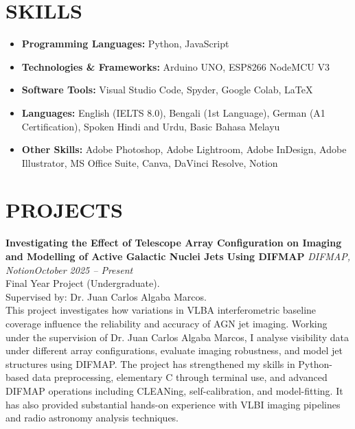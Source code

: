 \documentclass[10pt,a4paper]{article}
\begin{document}
\vspace{0.7mm}
\section*{SKILLS}
\begin{itemize}
    \item \textbf{Programming Languages:} Python, JavaScript
    \item \textbf{Technologies \& Frameworks:} Arduino UNO, ESP8266 NodeMCU V3
    \item \textbf{Software Tools:} Visual Studio Code, Spyder, Google Colab, LaTeX
    \item \textbf{Languages:} English (IELTS 8.0), Bengali (1st Language), German (A1 Certification), Spoken Hindi and Urdu, Basic Bahasa Melayu
    \item \textbf{Other Skills:} Adobe Photoshop, Adobe Lightroom, Adobe InDesign, Adobe Illustrator, MS Office Suite, Canva, DaVinci Resolve, Notion
\end{itemize}
\vspace{2mm}


\vspace{0.7mm}
\section*{PROJECTS}
\vspace{1mm}
\textbf{Investigating the Effect of Telescope Array Configuration on Imaging and Modelling of Active Galactic Nuclei Jets Using DIFMAP} \textbar{} \textit{DIFMAP, Notion}\hfill\textit{October 2025 -- Present}\\[1mm]
Final Year Project (Undergraduate).\\ 
Supervised by: Dr. Juan Carlos Algaba Marcos.\\[1mm]
This project investigates how variations in VLBA interferometric baseline coverage influence the reliability and accuracy of AGN jet imaging. Working under the supervision of Dr. Juan Carlos Algaba Marcos, I analyse visibility data under different array configurations, evaluate imaging robustness, and model jet structures using DIFMAP. The project has strengthened my skills in Python-based data preprocessing, elementary C through terminal use, and advanced DIFMAP operations including CLEANing, self-calibration, and model-fitting. It has also provided substantial hands-on experience with VLBI imaging pipelines and radio astronomy analysis techniques.
\vspace{3.2mm}
\end{document}

